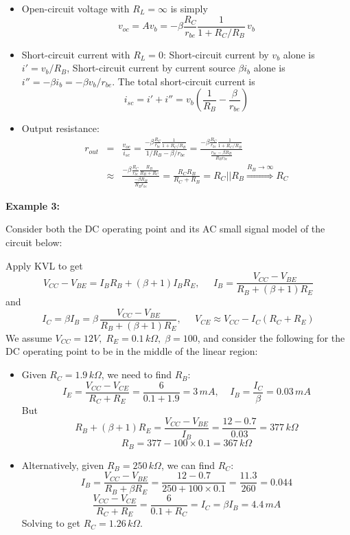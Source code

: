 \begin{itemize}
\begin{itemize}
  \begin{itemize}
  \item Open-circuit voltage with $R_L=\infty$ is simply
    \[
    v_{oc}=A v_b=-\beta\frac{R_C}{r_{be}}\frac{1}{1+R_C/R_B}\,v_b
    \]

  \item Short-circuit current with $R_L=0$:
    Short-circuit current by $v_b$ alone is $i'=v_b/R_B$,
    Short-circuit current by current source $\beta i_b$ alone is
    $i''=-\beta i_b=-\beta v_b/r_{be}$. The total short-circuit current is
    \[
    i_{sc}=i'+i''=v_b\left(\frac{1}{R_B}-\frac{\beta}{r_{be}}\right)
    \]
  \item Output resistance:
    \begin{eqnarray}
    r_{out}&=&\frac{v_{oc}}{i_{sc}}=\frac{-\beta\frac{R_C}{r_{be}}\frac{1}{1+R_C/R_B}}
    {1/R_B-\beta/r_{be}}
    =\frac{-\beta\frac{R_C}{r_{be}}\frac{1}{1+R_C/R_B}}{\frac{r_{be}-\beta R_B}{R_B r_{be}}}
    \nonumber\\
    &\approx& \frac{-\beta\frac{R_C}{r_{be}}\frac{R_B}{R_B+R_C}}{\frac{-\beta R_B}{R_B r_{be}}}
    =\frac{R_C R_B}{R_C+R_B}=R_C||R_B\stackrel{R_B\rightarrow\infty}{\Longrightarrow}R_C
    \nonumber
    \end{eqnarray}

  \end{itemize}

\end{itemize}

{\bf Example 3:}

Consider both the DC operating point and its AC small signal model of the
circuit below:


Apply KVL to get
\[
V_{CC}-V_{BE}=I_B R_B+(\beta+1)I_BR_E,\;\;\;\;\;
I_B=\frac{V_{CC}-V_{BE}}{R_B+(\beta+1)R_E}
\]
and
\[
I_C=\beta I_B=\beta\,\frac{V_{CC}-V_{BE}}{R_B+(\beta+1)R_E},\;\;\;\;\;
V_{CE}\approx V_{CC}-I_C(R_C+R_E)
\]
We assume $V_{CC}=12V,\;R_E=0.1\,k\Omega,\;\beta=100$, and consider the
following for the DC operating point to be in the middle of the linear 
region:
\begin{itemize}
\item Given $R_C=1.9\,k\Omega$, we need to find $R_B$:
  \[
  I_E=\frac{V_{CC}-V_{CE}}{R_C+R_E}=\frac{6}{0.1+1.9}=3\,mA,\;\;\;\;
  I_B=\frac{I_C}{\beta}=0.03\,mA
  \]
  But 
  \[
  R_B+(\beta+1)R_E=\frac{V_{CC}-V_{BE}}{I_B}=\frac{12-0.7}{0.03}=377\,k\Omega
  \]
  \[
  R_B=377-100\times 0.1=367\,k\Omega
  \]
\item Alternatively, given $R_B=250\,k\Omega$, we can find $R_C$:
  \[
  I_B=\frac{V_{CC}-V_{BE}}{R_B+\beta R_E}
  =\frac{12-0.7}{250+100\times 0.1}=\frac{11.3}{260}=0.044
  \]
  \[
  \frac{V_{CC}-V_{CE}}{R_C+R_E}=\frac{6}{0.1+R_C}=I_C=\beta I_B=4.4\,mA
  \]
  Solving to get $R_C=1.26\,k\Omega$.
\end{itemize}


\end{itemize}
